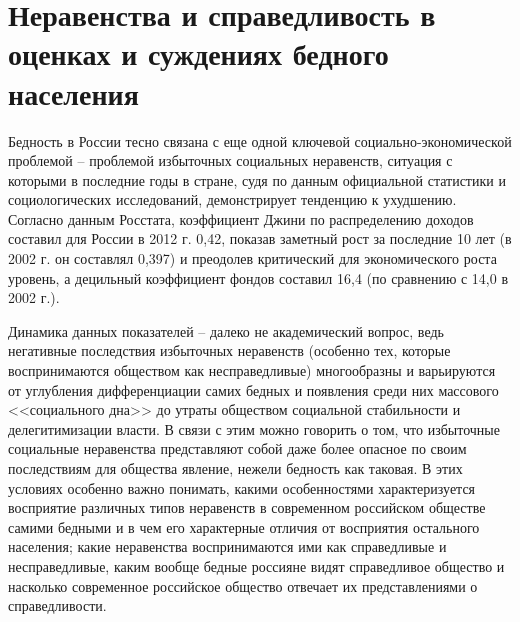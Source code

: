 \chapter{Неравенства и справедливость в оценках и суждениях бедного населения}
Бедность в России тесно связана с еще одной ключевой социально-экономической 
проблемой -- проблемой избыточных социальных неравенств, ситуация с которыми в 
последние годы в стране, судя по данным официальной статистики и 
социологических исследований, демонстрирует тенденцию к ухудшению. Согласно 
данным Росстата, коэффициент Джини по распределению доходов составил для 
России в 2012 г. 0,42, показав заметный рост за последние 10 лет (в 2002 г. 
он составлял 0,397) и преодолев критический для экономического роста 
уровень\footnotemark[1], а децильный коэффициент фондов составил 16,4 (по 
сравнению с 14,0 в 2002 г.)\footnotemark[2].


Динамика данных показателей -- далеко не академический вопрос, ведь негативные 
последствия избыточных неравенств (особенно тех, которые воспринимаются 
обществом как несправедливые) многообразны и варьируются от углубления 
дифференциации самих бедных и появления среди них массового <<социального 
дна>> до утраты обществом социальной стабильности и делегитимизации власти. В 
связи с этим можно говорить о том, что избыточные социальные неравенства 
представляют собой даже более опасное по своим последствиям для общества 
явление, нежели бедность как таковая. В этих условиях особенно важно понимать, 
какими особенностями характеризуется восприятие различных типов неравенств в 
современном российском обществе самими бедными и в чем его характерные отличия 
от восприятия остального населения; какие неравенства воспринимаются ими как 
справедливые и несправедливые, каким вообще бедные россияне видят справедливое 
общество и насколько современное российское общество отвечает их 
представлениями о справедливости.

